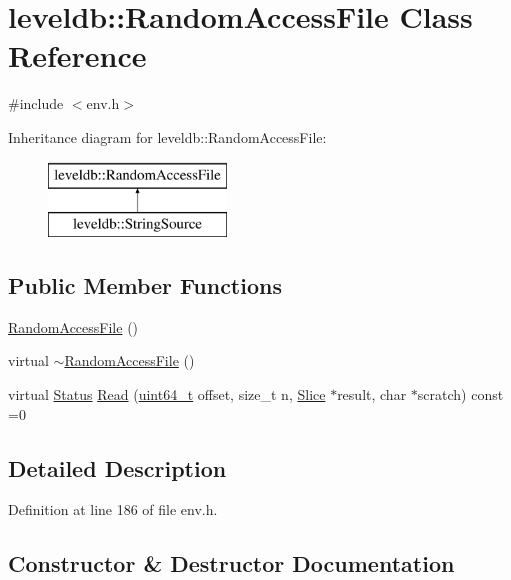 \hypertarget{classleveldb_1_1_random_access_file}{}\section{leveldb\+:\+:Random\+Access\+File Class Reference}
\label{classleveldb_1_1_random_access_file}


{\ttfamily \#include $<$env.\+h$>$}

Inheritance diagram for leveldb\+:\+:Random\+Access\+File\+:\begin{figure}[H]
\begin{center}
\leavevmode
\includegraphics[height=2.000000cm]{classleveldb_1_1_random_access_file}
\end{center}
\end{figure}
\subsection*{Public Member Functions}
\begin{DoxyCompactItemize}
\item 
\hyperlink{classleveldb_1_1_random_access_file_af5112c2ca05fe2fa79ef5ca868164ff7}{Random\+Access\+File} ()
\item 
virtual \hyperlink{classleveldb_1_1_random_access_file_af8557f9315f6924af0bd3f0cb38474f4}{$\sim$\+Random\+Access\+File} ()
\item 
virtual \hyperlink{classleveldb_1_1_status}{Status} \hyperlink{classleveldb_1_1_random_access_file_a1a09fadcec904d9791a968acabca98d0}{Read} (\hyperlink{stdint_8h_aaa5d1cd013383c889537491c3cfd9aad}{uint64\+\_\+t} offset, size\+\_\+t n, \hyperlink{classleveldb_1_1_slice}{Slice} $\ast$result, char $\ast$scratch) const =0
\end{DoxyCompactItemize}


\subsection{Detailed Description}


Definition at line 186 of file env.\+h.



\subsection{Constructor \& Destructor Documentation}
\hypertarget{classleveldb_1_1_random_access_file_af5112c2ca05fe2fa79ef5ca868164ff7}{}
